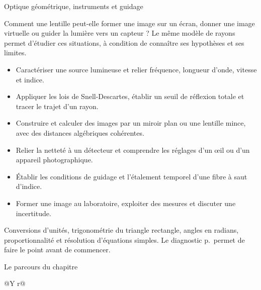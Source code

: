 \vspace{2mm}
{\otLight\fontsize{18}{23}\selectfont\color{otNavy}Optique géométrique, instruments et guidage}\par
\vspace{3mm}
Comment une lentille peut-elle former une image sur un écran, donner une image virtuelle ou guider la lumière vers un capteur ? Le même modèle de rayons permet d'étudier ces situations, à condition de connaître ses hypothèses et ses limites.
\begin{itemize}
\item Caractériser une source lumineuse et relier fréquence, longueur d'onde, vitesse et indice.
\item Appliquer les lois de Snell-Descartes, établir un seuil de réflexion totale et tracer le trajet d'un rayon.
\item Construire et calculer des images par un miroir plan ou une lentille mince, avec des distances algébriques cohérentes.
\item Relier la netteté à un détecteur et comprendre les réglages d'un œil ou d'un appareil photographique.
\item Établir les conditions de guidage et l'étalement temporel d'une fibre à saut d'indice.
\item Former une image au laboratoire, exploiter des mesures et discuter une incertitude.
\end{itemize}
Conversions d'unités, trigonométrie du triangle rectangle, angles en radians, proportionnalité et résolution d'équations simples. Le diagnostic p.\,\pageref{ch01-diagnostic} permet de faire le point avant de commencer.
\begin{loi}{Le parcours du chapitre}
\begin{tabularx}{\linewidth}{@{}Y r@{}}
\end{tabularx}
\end{loi}


